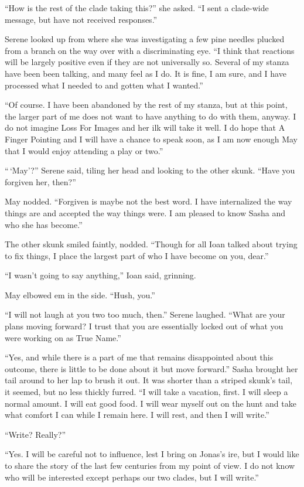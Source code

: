 ``How is the rest of the clade taking this?'' she asked. ``I sent a clade-wide message, but have not received responses.''

Serene looked up from where she was investigating a few pine needles plucked from a branch on the way over with a discriminating eye. ``I think that reactions will be largely positive even if they are not universally so. Several of my stanza have been been talking, and many feel as I do. It is fine, I am sure, and I have processed what I needed to and gotten what I wanted.''

``Of course. I have been abandoned by the rest of my stanza, but at this point, the larger part of me does not want to have anything to do with them, anyway. I do not imagine Loss For Images and her ilk will take it well. I do hope that A Finger Pointing and I will have a chance to speak soon, as I am now enough May that I would enjoy attending a play or two.''

``\,`May'?'' Serene said, tiling her head and looking to the other skunk. ``Have you forgiven her, then?''

May nodded. ``Forgiven is maybe not the best word. I have internalized the way things are and accepted the way things were. I am pleased to know Sasha and who she has become.''

The other skunk smiled faintly, nodded. ``Though for all Ioan talked about trying to fix things, I place the largest part of who I have become on you, dear.''

``I wasn't going to say anything,'' Ioan said, grinning.

May elbowed em in the side. ``Hush, you.''

``I will not laugh at you two too much, then.'' Serene laughed. ``What are your plans moving forward? I trust that you are essentially locked out of what you were working on as True Name.''

``Yes, and while there is a part of me that remains disappointed about this outcome, there is little to be done about it but move forward.'' Sasha brought her tail around to her lap to brush it out. It was shorter than a striped skunk's tail, it seemed, but no less thickly furred. ``I will take a vacation, first. I will sleep a normal amount. I will eat good food. I will wear myself out on the hunt and take what comfort I can while I remain here. I will rest, and then I will write.''

``Write? Really?''

``Yes. I will be careful not to influence, lest I bring on Jonas's ire, but I would like to share the story of the last few centuries from my point of view. I do not know who will be interested except perhaps our two clades, but I will write.''

